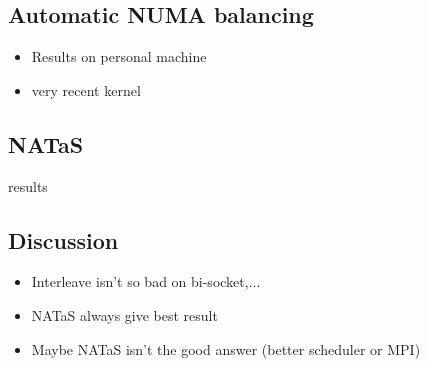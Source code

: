 \documentclass[oneside,12t]{classes/Thesis}
\begin{document}
\subsection{Automatic NUMA balancing}
  \begin{itemize}
    \item Results on personal machine
    \item very recent kernel
  \end{itemize}
\subsection{NATaS}
results
\subsection{Discussion}
  \begin{itemize}
    \item Interleave isn't so bad on bi-socket,...
    \item NATaS always give best result
    \item Maybe NATaS isn't the good answer (better scheduler or MPI)
  \end{itemize}


\end{document}
